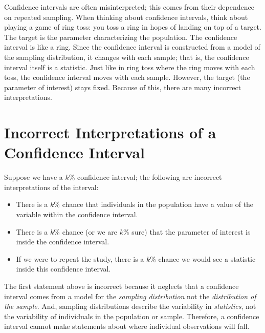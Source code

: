 \documentclass[
  letterpaper,
  DIV=11,
  numbers=noendperiod]{scrreprt}
\providecommand{\tightlist}{%
  \setlength{\itemsep}{0pt}\setlength{\parskip}{0pt}}\usepackage{longtable,booktabs,array}
\theoremstyle{definition}
\theoremstyle{definition}
\theoremstyle{plain}
\theoremstyle{remark}
\begin{document}
Confidence intervals are often misinterpreted; this comes from their
dependence on repeated sampling. When thinking about confidence
intervals, think about playing a game of ring toss: you toss a ring in
hopes of landing on top of a target. The target is the parameter
characterizing the population. The confidence interval is like a ring.
Since the confidence interval is constructed from a model of the
sampling distribution, it changes with each sample; that is, the
confidence interval itself is a statistic. Just like in ring toss where
the ring moves with each toss, the confidence interval moves with each
sample. However, the target (the parameter of interest) stays fixed.
Because of this, there are many incorrect interpretations.

\hypertarget{incorrect-interpretations-of-a-confidence-interval}{%
\section{Incorrect Interpretations of a Confidence
Interval}\label{incorrect-interpretations-of-a-confidence-interval}}

Suppose we have a \(k\)\% confidence interval; the following are
incorrect interpretations of the interval:

\begin{itemize}
\tightlist
\item
  There is a \(k\)\% chance that individuals in the population have a
  value of the variable within the confidence interval.
\item
  There is a \(k\)\% chance (or we are \(k\)\% sure) that the parameter
  of interest is inside the confidence interval.
\item
  If we were to repeat the study, there is a \(k\)\% chance we would see
  a statistic inside this confidence interval.
\end{itemize}

The first statement above is incorrect because it neglects that a
confidence interval comes from a model for the \emph{sampling
distribution} not the \emph{distribution of the sample}. And, sampling
distributions describe the variability in \emph{statistics}, not the
variability of individuals in the population or sample. Therefore, a
confidence interval cannot make statements about where individual
observations will fall.
\end{document}
